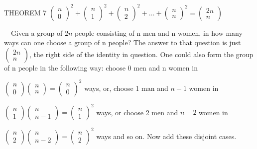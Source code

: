 \documentclass{article}
\begin{document}
THEOREM 7  
$\left(\begin{matrix}n\\0\end{matrix}\right)^2+\left(\begin{matrix}n\\1\end{matrix}\right)^2+\left(\begin{matrix}n\\2\end{matrix}\right)^2+{\dots}+\left(\begin{matrix}n\\n\end{matrix}\right)^2=\left(\begin{matrix}2n\\n\end{matrix}\right)$

\ \ Given a group of  $2n$ people consisting of  n men and  n women, in how many ways can one choose a group of  n 
people?  The answer to that question is just $\left(\begin{matrix}2n\\n\end{matrix}\right)$, the right side of the
identity in question.  One could also form the group of n  people in the following way: choose  0 men and  n women in 


$\left(\begin{matrix}n\\0\end{matrix}\right)\left(\begin{matrix}n\\n\end{matrix}\right)=\left(\begin{matrix}n\\0\end{matrix}\right)^2$
ways, or, choose 1 man and  $n-1$ women in


$\left(\begin{matrix}n\\1\end{matrix}\right)\left(\begin{matrix}n\\n-1\end{matrix}\right)=\left(\begin{matrix}n\\1\end{matrix}\right)^2$
ways, or choose 2 men and  $n-2$ women in


$\left(\begin{matrix}n\\2\end{matrix}\right)\left(\begin{matrix}n\\n-2\end{matrix}\right)=\left(\begin{matrix}n\\2\end{matrix}\right)^2$
ways and so on.  Now add these disjoint cases.
\end{document}
